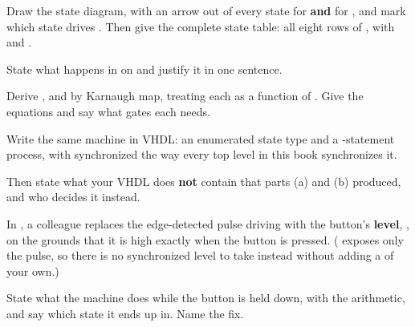  Draw the state diagram, with an arrow out of every state for  \textbf{and}
for , and mark which state drives . Then give the complete state table:
all eight rows of \mbox{}, with \mbox{} and .

State what happens in  on  and justify it in one sentence. 

 Derive ,  and  by Karnaugh map, treating each as a function
of \mbox{}. Give the equations and say what gates each needs. 

 Write the same machine in VHDL: an enumerated state type and a -statement
process, with  synchronized the way every top level in this book synchronizes it.

Then state what your VHDL does \textbf{not} contain that parts (a) and (b) produced, and who decides
it instead. 

 In , a colleague replaces the edge-detected pulse driving
 with the button's \textbf{level}, , on the grounds that
it is high exactly when the button is pressed. ( exposes only the pulse, so there
is no synchronized level to take instead without adding a  of your own.)

State what the machine does while the button is held down, with the arithmetic, and say which state
it ends up in. Name the fix. 
